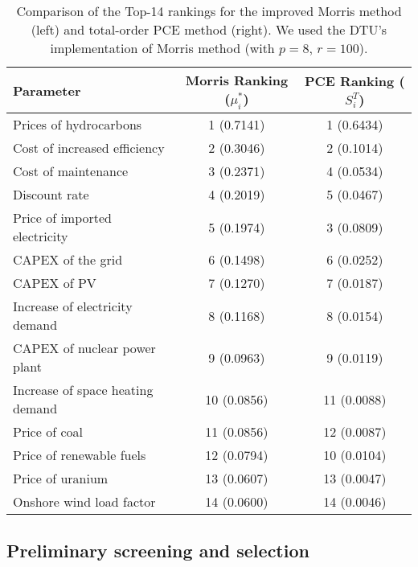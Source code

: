 \begin{table}[htbp]
	\caption{Comparison of the Top-14 rankings for the improved Morris method (left) and total-order \gls{PCE} method (right). We used the DTU's implementation of Morris method \cite{MorrisCodeDTU} (with $p=8$, $r=100$). }
    \label{tab:GSA:Comparison}
    \centering
    \begin{tabular}{lcc}
    \toprule
		\textbf{Parameter} & \textbf{Morris Ranking} ($\mu^*_{i}$) & \textbf{PCE Ranking} ($S_i^T$) \\
        \midrule
        Prices of hydrocarbons & 1 (0.7141) & 1 (0.6434) \\
        Cost of increased efficiency & 2 (0.3046) & 2 (0.1014) \\
        Cost of maintenance & 3 (0.2371) & 4 (0.0534) \\
        Discount rate & 4 (0.2019) & 5 (0.0467) \\
        Price of imported electricity & 5 (0.1974) & 3 (0.0809) \\
        CAPEX of the grid & 6 (0.1498) & 6 (0.0252) \\
        CAPEX of PV & 7 (0.1270) & 7 (0.0187) \\
        Increase of electricity demand & 8 (0.1168) & 8 (0.0154) \\
        CAPEX of nuclear power plant & 9 (0.0963) & 9 (0.0119) \\
        Increase of space heating demand & 10 (0.0856) & 11 (0.0088) \\
        Price of coal & 11 (0.0856) & 12 (0.0087)\\
        Price of renewable fuels & 12 (0.0794) & 10 (0.0104)\\
        Price of uranium & 13 (0.0607) & 13 (0.0047)\\
        Onshore wind load factor & 14 (0.0600) & 14 (0.0046)\\
       \bottomrule
    \end{tabular}
\end{table}

\subsection{Preliminary screening and selection}
\label{subsec:screening}

